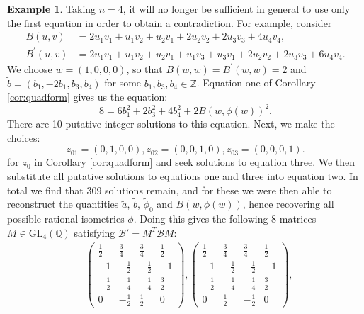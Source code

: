 \documentclass{amsart}
\theoremstyle{plain}
\theoremstyle{definition}
\newtheorem{eg}[theorem]{Example}
\begin{document}
\begin{eg}
\label{eg:rank4}
    Taking $n=4$, it will no longer be sufficient in general to use only the first equation in order to obtain a contradiction. For example, consider
    \begin{align*}
        B(u,v)&=2u_1v_1+u_1v_2+u_2v_1+2u_2v_2+2u_3v_3+4u_4v_4, \\
        B^\prime(u,v)&=2u_1v_1+u_1v_2+u_2v_1+u_1v_3+u_3v_1+2u_2v_2+2u_3v_3+6u_4v_4.
    \end{align*}
    We choose $w=(1,0,0,0)$, so that $B(w,w)=B^\prime(w,w)=2$ and $\tilde{b}=(b_1,-2b_1,b_3,b_4)$ for some $b_1,b_3,b_4\in\mathbb{Z}$. Equation one of Corollary \ref{cor:quadform} gives us the equation:
    \begin{equation*}
        8=6b_1^2+2b_3^2+4b_4^2+2B(w,\phi(w))^2.
    \end{equation*}
    There are 10 putative integer solutions to this equation. Next, we make the choices:
    \begin{equation*}
        z_{01}=(0,1,0,0), z_{02}=(0,0,1,0), z_{03}=(0,0,0,1).
    \end{equation*}
    for $z_0$ in Corollary \ref{cor:quadform} and seek solutions to equation three. We then substitute all putative solutions to equations one and three into equation two. In total we find that $309$ solutions remain, and for these we were then able to reconstruct the quantities $\tilde{a}$, $\tilde{b}$, $\tilde{\phi}_0$ and $B(w, \phi(w))$, hence recovering all possible rational isometries $\phi$. Doing this gives the following 8 matrices $M\in\text{GL}_4(\mathbb{Q})$ satisfying $\mathcal{B}' = M^T\mathcal{B}M$:
    \begin{align*}
     &\left(\begin{smallmatrix}  \frac{1}{2} & \frac{3}{4} & \frac{3}{4} & \frac{1}{2} \\
     -1 & -\frac{1}{2} & -\frac{1}{2} & -1 \\ -\frac{1}{2} & -\frac{1}{4} & -\frac{1}{4} & \frac{3}{2} \\
     0 & -\frac{1}{2} & \frac{1}{2} & 0 \end{smallmatrix} \right),  \left(\begin{smallmatrix}  \frac{1}{2} & \frac{3}{4} & \frac{3}{4} & \frac{1}{2} \\
     -1 & -\frac{1}{2} & -\frac{1}{2} & -1 \\ -\frac{1}{2} & -\frac{1}{4} & -\frac{1}{4} & \frac{3}{2} \\
     0 & \frac{1}{2} & -\frac{1}{2} & 0 \end{smallmatrix} \right),

\end{align*}
\end{eg}
\end{document}
